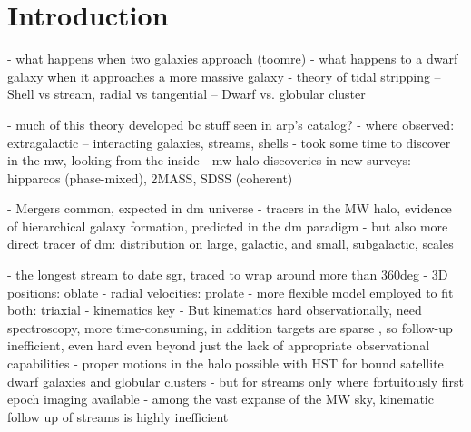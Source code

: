 \documentclass[final,5p,times,twocolumn,authoryear]{elsarticle}
\begin{document}
\begin{frontmatter}
%

\begin{keyword}



\end{keyword}

\end{frontmatter}


\section{Introduction}
\label{sec:intro}

- what happens when two galaxies approach (toomre)
- what happens to a dwarf galaxy when it approaches a more massive galaxy
- theory of tidal stripping
-- Shell vs stream, radial vs tangential
-- Dwarf vs. globular cluster

- much of this theory developed bc stuff seen in arp's catalog?
- where observed: extragalactic -- interacting galaxies, streams, shells
- took some time to discover in the mw, looking from the inside
- mw halo discoveries in new surveys: hipparcos (phase-mixed), 2MASS, SDSS (coherent)

- Mergers common, expected in dm universe
- tracers in the MW halo, evidence of hierarchical galaxy formation, predicted in the dm paradigm
- but also more direct tracer of dm: distribution on large, galactic, and small, subgalactic, scales

- the longest stream to date sgr, traced to wrap around more than 360deg \citep{majewski, belokurov}
- 3D positions: oblate \citep{johnston}
- radial velocities: prolate \citep{helmi}
- more flexible model employed to fit both: triaxial \citep{law, lmj}
- kinematics key \citep{bh:2018, nibauer, pearson}
- But kinematics hard observationally, need spectroscopy, more time-consuming, in addition targets are sparse \citep{kuzma, etc}, so follow-up inefficient, even hard even beyond just the lack of appropriate observational capabilities
- proper motions in the halo possible with HST for bound satellite dwarf galaxies and globular clusters \citep{kallivayalil, vdmarel, sohn, watkins}
- but for streams only where fortuitously first epoch imaging available \citep{sohn}
- among the vast expanse of the MW sky, kinematic follow up of streams is highly inefficient
\end{document}
